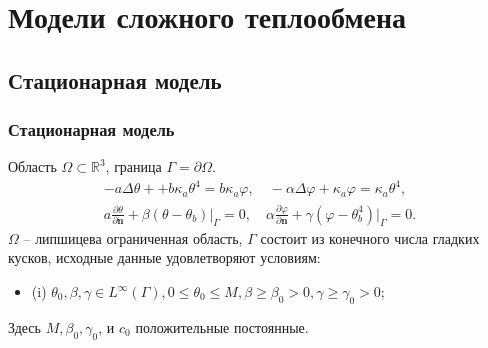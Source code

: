 \section{Модели сложного теплообмена}\label{sec:$p_1$}

\subsection{Стационарная модель}\label{subsec:st}
\begin{frame}
    \frametitle{Стационарная модель}
    Область $\Omega \subset \mathbb{R}^3$, граница  $\Gamma = \partial \Omega$.
    \begin{gather}
        -a \Delta \theta + + b \kappa_a \theta^4 =  b \kappa_a \varphi,
        \quad
        - \alpha \Delta \varphi + \kappa_a \varphi = \kappa_a \theta^4,  \label{eq:pres:1}\\
        a \frac{\partial \theta}{\partial \mathbf{n}}
        +\left.\beta\left(\theta-\theta_{b}\right)\right|_{\Gamma}=0,
        \quad
        \alpha \frac{\partial \varphi}{\partial \mathbf{n}} + \gamma
        (\varphi-\theta_b^4)|_{\Gamma} = 0. \label{eq:pres:2}
    \end{gather}
    $\Omega$ -- липшицева ограниченная область, $\Gamma$ состоит из конечного числа гладких кусков,
    исходные данные удовлетворяют условиям:
    \begin{itemize}
        \item (i) $\theta_{0}, \beta, \gamma \in L^{\infty}(\Gamma),
        0 \leqslant \theta_{0} \leqslant M, \beta \geqslant \beta_{0}>0, \gamma \geqslant \gamma_{0}>0$;
    \end{itemize}
    Здесь $M, \beta_{0}, \gamma_{0}$, и $c_{0}$ положительные постоянные.
\end{frame}
%


